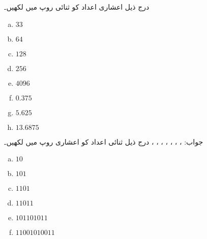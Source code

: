 درج ذیل اعشاری اعداد کو ثنائی روپ میں لکھیں۔
\begin{multicols}{4}
\begin{enumerate}[a.]

\item

 \(33\)

\item

 \(64\)

\item

 \(128\) 

\item

 \(256\)

\item

 \(4096\)

\item

 \(0.375\)

\item

 \(5.625\) 

\item

 \(13.6875\)
\end{enumerate}
\end{multicols}
جواب: ، ، ، ، ، ، ، 
درج ذیل ثنائی اعداد کو اعشاری روپ میں لکھیں۔
\begin{multicols}{4}
\begin{enumerate}[a.]

\item  
 
 \(10\)  

\item  
 
 \(101\) 

\item  
 
 \(1101\)  

\item  
 
 \(11011\)

\item  
 
 \(101101011\) 

\item  
 
 \(11001010011\)  
\end{enumerate}
\end{multicols}

